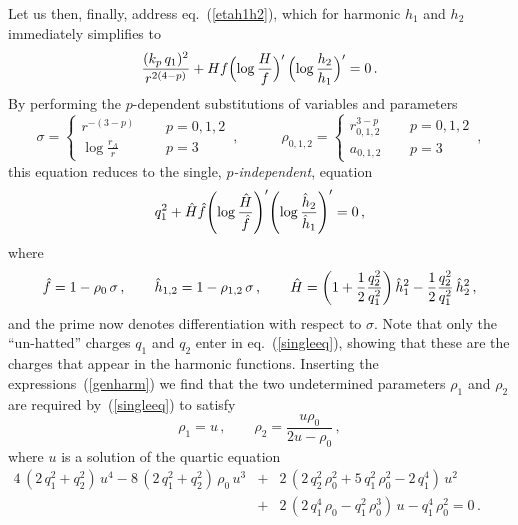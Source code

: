 \documentclass[a4paper,11pt]{article}
\newcommand{\hH}{\hat{H}} \newcommand{\hf}{\hat{f}}
\newcommand{\nn}{\nonumber}  \newcommand{\spa}{\,,\qquad}
\newcommand{\eqref}[1]{(\ref{#1})}
\begin{document}
Let us then, finally, address eq.~\eqref{etah1h2}, which for
harmonic $h_1$ and $h_2$ immediately simplifies to
\begin{equation}
\label{etah1h2harm}
 \frac{(k_p\,q_1)^2}{r^{2(4-p)}} + H f
  \Big(\!\log\frac{H}{f}\Big)'\,\Big(\!\log\frac{h_2}{h_1}\Big)' =
  0\,.\\[1ex]
\end{equation}
By performing the $p$-dependent substitutions of variables and
parameters
\begin{equation}
\sigma = \left\{\begin{array}{lll} r^{-(3-p)}\, &~~& p=0,1,2 \\[1ex]
     \log{\frac{r_\Lambda}{r}}  & & p=3 \end{array} \right. \spa\quad
%
\rho_{0,1,2} = \left\{\begin{array}{lll} r_{0,1,2}^{3-p} &~~& p=0,1,2
  \\[1ex] a_{0,1,2}   & & p=3 \end{array} \right. \,,
\end{equation} 
this equation reduces to the single, \emph{$p$-independent}, equation
\begin{equation}
\label{singleeq}
q_1^2 + \hH \hf\Bigg(\!\log\frac{\hH}{\hf}\Bigg)'
         \Bigg(\!\log{\frac{\hh_2}{\hh_1}}\Bigg)'=0 \,,
\end{equation}
where
\begin{equation}
\label{genharm}
\hf=1-\rho_0\,\sigma \spa  \hh_{1,2}=1-\rho_{1,2}\,\sigma \spa \hH =
\left( 1 + \frac{1}{2} \frac{q_2^2}{q_1^2} \right) \hh_1^2 -
\frac{1}{2} \frac{q_2^2}{q_1^2}\,\hh_2^2 \,,
\end{equation}
and the prime now denotes differentiation with respect to $\sigma$.
Note that only the ``un-hatted'' charges $q_1$ and $q_2$ enter in
eq.~\eqref{singleeq}, showing that these are the charges that appear
in the harmonic functions. Inserting the expressions~\eqref{genharm}
we find that the two undetermined parameters $\rho_1$ and $\rho_2$
are required by~\eqref{singleeq} to satisfy
%
\begin{equation}
\label{r1r2rel}
\rho_1 = u \spa \rho_2 = \frac{ u \rho_0 }{2u - \rho_0} \,,
\end{equation}
%
where $u$ is a solution of the quartic equation
%
\begin{eqnarray}
\label{qua1}
 4\,(2\,q_1^2+q_2^2)\,u^4 - 8\,(2\,q_1^2 + q_2^2)\,\rho_0\,u^3 &+&
  2\,(2\,q_2^2\, \rho_0^2 + 5\, q_1^2\,\rho_0^2 - 2\,q_1^4 )\,u^2
  \mbox{~~~~~~~~~~~~~~~} \nn \\ &+& 2\,(2 \,q_1^4 \,\rho_0 - q_1^2\,
  \rho_0^3)\, u - q_1^4 \,\rho_0^2 = 0 \,.
\end{eqnarray}
\end{document}
